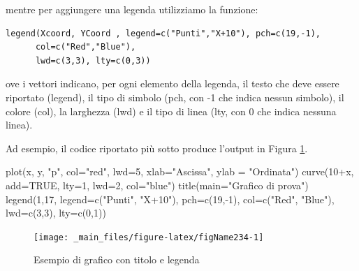 \documentclass[a4paper,12pt,oneside]{book}
\newenvironment{Shaded}{}{}
\newcommand{\KeywordTok}[1]{#1}
\newcommand{\DataTypeTok}[1]{#1}
\newcommand{\DecValTok}[1]{#1}
\newcommand{\StringTok}[1]{#1}
\newcommand{\OtherTok}[1]{#1}
\newcommand{\OperatorTok}[1]{#1}
\newcommand{\NormalTok}[1]{#1}
\begin{document}
mentre per aggiungere una legenda utilizziamo la funzione:

\begin{verbatim}
legend(Xcoord, YCoord , legend=c("Punti","X+10"), pch=c(19,-1),
      col=c("Red","Blue"),
      lwd=c(3,3), lty=c(0,3))
\end{verbatim}

ove i vettori indicano, per ogni elemento della legenda, il testo che deve essere riportato (legend), il tipo di simbolo (pch, con -1 che indica nessun simbolo), il colore (col), la larghezza (lwd) e il tipo di linea (lty, con 0 che indica nessuna linea).

Ad esempio, il codice riportato più sotto produce l'output in Figura \ref{fig:figName234}.

\begin{Shaded}
\begin{Highlighting}[]
\KeywordTok{plot}\NormalTok{(x, y, }\StringTok{"p"}\NormalTok{, }\DataTypeTok{col=}\StringTok{"red"}\NormalTok{, }\DataTypeTok{lwd=}\DecValTok{5}\NormalTok{, }\DataTypeTok{xlab=}\StringTok{"Ascissa"}\NormalTok{, }
       \DataTypeTok{ylab =} \StringTok{"Ordinata"}\NormalTok{)}
\KeywordTok{curve}\NormalTok{(}\DecValTok{10}\OperatorTok{+}\NormalTok{x, }\DataTypeTok{add=}\OtherTok{TRUE}\NormalTok{, }\DataTypeTok{lty=}\DecValTok{1}\NormalTok{, }\DataTypeTok{lwd=}\DecValTok{2}\NormalTok{, }\DataTypeTok{col=}\StringTok{"blue"}\NormalTok{)}
\KeywordTok{title}\NormalTok{(}\DataTypeTok{main=}\StringTok{"Grafico di prova"}\NormalTok{)}
\KeywordTok{legend}\NormalTok{(}\DecValTok{1}\NormalTok{,}\DecValTok{17}\NormalTok{, }\DataTypeTok{legend=}\KeywordTok{c}\NormalTok{(}\StringTok{"Punti"}\NormalTok{, }\StringTok{"X+10"}\NormalTok{), }\DataTypeTok{pch=}\KeywordTok{c}\NormalTok{(}\DecValTok{19}\NormalTok{,}\OperatorTok{-}\DecValTok{1}\NormalTok{), }
  \DataTypeTok{col=}\KeywordTok{c}\NormalTok{(}\StringTok{"Red"}\NormalTok{, }\StringTok{"Blue"}\NormalTok{), }\DataTypeTok{lwd=}\KeywordTok{c}\NormalTok{(}\DecValTok{3}\NormalTok{,}\DecValTok{3}\NormalTok{), }\DataTypeTok{lty=}\KeywordTok{c}\NormalTok{(}\DecValTok{0}\NormalTok{,}\DecValTok{1}\NormalTok{))}
\end{Highlighting}
\end{Shaded}

\begin{figure}

{\centering \texttt{[image: \_main\_files/figure-latex/figName234-1]} 

}

\caption{Esempio di grafico con titolo e legenda}\label{fig:figName234}
\end{figure}
\end{document}
